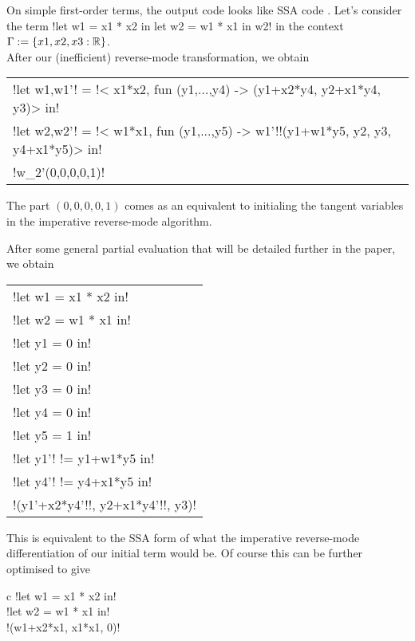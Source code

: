 \begin{example}
On simple first-order terms, the output code looks like SSA code \cite{}.
Let's consider  the term !let w1 = x1 * x2 in let w2 = w1 * x1 in w2! in the context $\Gamma:=\{x1,x2,x3:\mathbb{R}\}$.\\
After our (inefficient) reverse-mode transformation, we obtain
\begin{center}
    \begin{tabular}{l}
        !let w1,w1'! = !< x1*x2, fun (y1,...,y4) -> (y1+x2*y4, y2+x1*y4, y3)> in!\\
        !let w2,w2'! = !< w1*x1, fun (y1,...,y5) -> w1'!!(y1+w1*y5, y2, y3, y4+x1*y5)> in!\\
        !w_2'(0,0,0,0,1)!
    \end{tabular}
\end{center}
The part $(0,0,0,0,1)$ comes as an equivalent to initialing the tangent variables in the imperative reverse-mode algorithm. 

After some general partial evaluation that will be detailed further in the paper, we obtain     
        \begin{center}
            \begin{tabular}{l}
                !let w1 = x1 * x2 in!\\ 
                !let w2 = w1 * x1 in!\\
                !let y1 = 0 in!\\
                !let y2 = 0 in!\\
                !let y3 = 0 in!\\
                !let y4 = 0 in!\\
                !let y5 = 1 in!\\
                !let y1'! != y1+w1*y5 in!\\
                !let y4'! != y4+x1*y5 in!\\
                !(y1'+x2*y4'!!, y2+x1*y4'!!, y3)!
            \end{tabular}
        \end{center}  
This is equivalent to the SSA form of what the imperative reverse-mode differentiation of our initial term would be.
Of course this can be further optimised to give
        \begin{center}
            \begin{tabular}{{c}}
                !let w1 = x1 * x2 in!\\ 
                !let w2 = w1 * x1 in!\\
                !(w1+x2*x1, x1*x1, 0)!
            \end{tabular}
        \end{center}
    \end{example}

